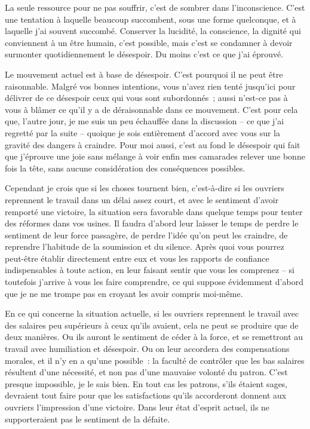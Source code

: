 \documentclass[french,twoside]{book} %
\begin{document}
La seule ressource pour ne pas souffrir, c'est de sombrer dans l'inconscience. C'est une tentation à laquelle beaucoup succombent, sous une forme quelconque, et à laquelle j'ai souvent succombé. Conserver la lucidité, la conscience, la dignité qui conviennent à un être humain, c'est possible, mais c'est se condamner à devoir surmonter quotidiennement le désespoir. Du moins c'est ce que j'ai éprouvé.\par
Le mouvement actuel est à base de désespoir. C'est pourquoi il ne peut être raisonnable. Malgré vos bonnes intentions, vous n'avez rien tenté jusqu'ici pour délivrer de ce désespoir ceux qui vous sont subordonnés ; aussi n'est-ce pas à vous à blâmer ce qu'il y a de déraisonnable dans ce mouvement. C'est pour cela que, l'autre jour, je me suis un peu échauffée dans la discussion – ce que j'ai regretté par la suite – quoique je sois entièrement d'accord avec vous sur la gravité des dangers à craindre. Pour moi aussi, c'est au fond le désespoir qui fait que j'éprouve une joie sans mélange à voir enfin mes camarades relever une bonne fois la tête, sans aucune considération des conséquences possibles.\par
Cependant je crois que si les choses tournent bien, c'est-à-dire si les ouvriers reprennent le travail dans un délai assez court, et avec le sentiment d'avoir remporté une victoire, la situation sera favorable dans quelque temps pour tenter des réformes dans vos usines. Il faudra d'abord leur laisser le temps de perdre le sentiment de leur force passagère, de perdre l'idée qu'on peut les craindre, de reprendre l'habitude de la soumission et du silence. Après quoi vous pourrez peut-être établir directement entre eux et vous les rapports de confiance indispensables à toute action, en leur faisant sentir que vous les comprenez – si toutefois j'arrive à vous les faire comprendre, ce qui suppose évidemment d'abord que je ne me trompe pas en croyant les avoir compris moi-même.\par
En ce qui concerne la situation actuelle, si les ouvriers reprennent le travail avec des salaires peu supérieurs à ceux qu'ils avaient, cela ne peut se produire que de deux manières. Ou ils auront le sentiment de céder à la force, et se remettront au travail avec humiliation et désespoir. Ou on leur accordera des compensations morales, et il n'y en a qu'une possible : la faculté de contrôler que les bas salaires résultent d'une nécessité, et non pas d'une mauvaise volonté du patron. C'est presque impossible, je le sais bien. En tout cas les patrons, s'ils étaient sages, devraient tout faire pour que les satisfactions qu'ils accorderont donnent aux ouvriers l'impression d'une victoire. Dans leur état d'esprit actuel, ils ne supporteraient pas le sentiment de la défaite.\par
\end{document}
